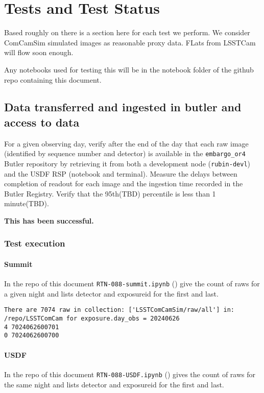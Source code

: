 \section{Tests and Test Status} \label{sec:testing}
Based roughly on  there is a section here for each test we perform.
We consider ComCamSim simulated images as reasonable proxy data.
FLats from LSSTCam will flow soon enough.

Any notebooks used for testing this will be in the notebook folder of the github repo containing this document.

\subsection{Data transferred and ingested in butler and access to data}
For a given observing day, verify after the end of the day that each raw image (identified by sequence number and detector) is available in the \texttt{embargo\_or4} Butler repository by retrieving it from both a development node (\texttt{rubin-devl}) and the USDF RSP (notebook and terminal).
Measure the delays between completion of readout for each image and the ingestion time recorded in the Butler Registry.
Verify that the 95th(TBD) percentile is less than 1 minute(TBD).

\textbf{This has been successful.}

\subsubsection{Test execution}
\paragraph{Summit}
In the repo of this document \texttt{RTN-088-summit.ipynb} () give the count of raws for a given night and lists detector and exposureid for the first and last.

\begin{lstlisting}
There are 7074 raw in collection: ['LSSTComCamSim/raw/all'] in: /repo/LSSTComCam for exposure.day_obs = 20240626
4 7024062600701
0 7024062600700
\end{lstlisting}

\paragraph{USDF}
In the repo of this document \texttt{RTN-088-USDF.ipynb} () gives the count of raws for the same night and lists detector and exposureid for the first and last.

